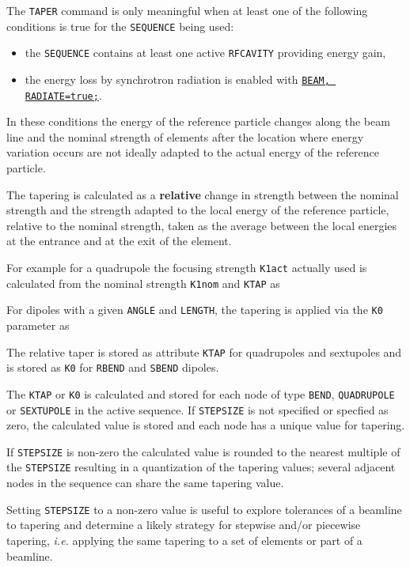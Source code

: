 The \texttt{TAPER} command is only meaningful when at least one of the
following conditions is true for the \texttt{SEQUENCE} being used:
\begin{itemize}
  \item the \texttt{SEQUENCE} contains at least one active
    \texttt{RFCAVITY} providing energy gain, 
  \item the energy loss by synchrotron radiation is enabled with
    \hyperref[sec:beam]{\texttt{BEAM, RADIATE=true;}}. 
\end{itemize}
In these conditions the energy of the reference particle changes along
the beam line and the nominal strength of elements after the location
where energy variation occurs are not ideally adapted to the actual
energy of the reference particle. 

The tapering is calculated as a \textbf{relative} change in strength
between the nominal strength and the strength adapted to the local
energy of the reference particle, relative to the nominal strength,
taken as the average between the local energies at the entrance and at
the exit of the element. 

For example for a quadrupole the focusing strength \texttt{K1act} actually used
is calculated from the nominal strength \texttt{K1nom} and
\texttt{KTAP} as

For dipoles with a given \texttt{ANGLE} and \texttt{LENGTH}, the
tapering is applied via the \texttt{K0} parameter as

The relative taper is stored as attribute \texttt{KTAP} for quadrupoles
and sextupoles and is stored as \texttt{K0} for \texttt{RBEND} and
\texttt{SBEND} dipoles.

The \texttt{KTAP} or \texttt{K0} is calculated and stored for each node
of type \texttt{BEND}, \texttt{QUADRUPOLE} or \texttt{SEXTUPOLE} in the
active sequence. If \texttt{STEPSIZE} is not specified or specfied as
zero, the calculated value is stored and each node has a unique value
for tapering.

If \texttt{STEPSIZE} is non-zero the calculated value is rounded to the
nearest multiple of the \texttt{STEPSIZE} resulting in a quantization of
the tapering values; several adjacent nodes in the sequence can share
the same tapering value.

Setting \texttt{STEPSIZE} to a non-zero value is useful to explore tolerances of a
beamline to tapering and determine a likely strategy for stepwise and/or piecewise
tapering, {\it i.e.} applying the same tapering to a set of elements or
part of a beamline.

